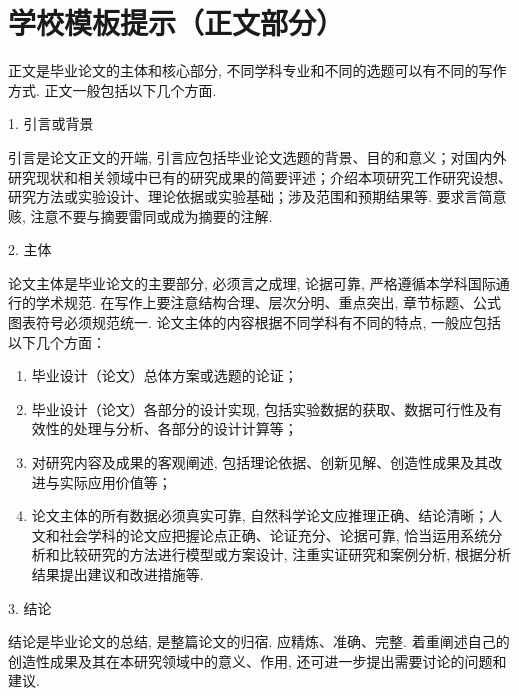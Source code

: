 \chapter{学校模板提示（正文部分）}

正文是毕业论文的主体和核心部分, 不同学科专业和不同的选题可以有不同的写作方式. 正文一般包括以下几个方面. 

1. 引言或背景

引言是论文正文的开端, 引言应包括毕业论文选题的背景、目的和意义；对国内外研究现状和相关领域中已有的研究成果的简要评述；介绍本项研究工作研究设想、研究方法或实验设计、理论依据或实验基础；涉及范围和预期结果等. 要求言简意赅, 注意不要与摘要雷同或成为摘要的注解. 

2. 主体

论文主体是毕业论文的主要部分, 必须言之成理, 论据可靠, 严格遵循本学科国际通行的学术规范. 在写作上要注意结构合理、层次分明、重点突出, 章节标题、公式图表符号必须规范统一. 论文主体的内容根据不同学科有不同的特点, 一般应包括以下几个方面：

\begin{enumerate}[(1)]
    \item 毕业设计（论文）总体方案或选题的论证；
    \item 毕业设计（论文）各部分的设计实现, 包括实验数据的获取、数据可行性及有效性的处理与分析、各部分的设计计算等；
    \item 对研究内容及成果的客观阐述, 包括理论依据、创新见解、创造性成果及其改进与实际应用价值等；
    \item 论文主体的所有数据必须真实可靠, 自然科学论文应推理正确、结论清晰；人文和社会学科的论文应把握论点正确、论证充分、论据可靠, 恰当运用系统分析和比较研究的方法进行模型或方案设计, 注重实证研究和案例分析, 根据分析结果提出建议和改进措施等. 
\end{enumerate}


3. 结论

结论是毕业论文的总结, 是整篇论文的归宿. 应精炼、准确、完整. 着重阐述自己的创造性成果及其在本研究领域中的意义、作用, 还可进一步提出需要讨论的问题和建议. 
